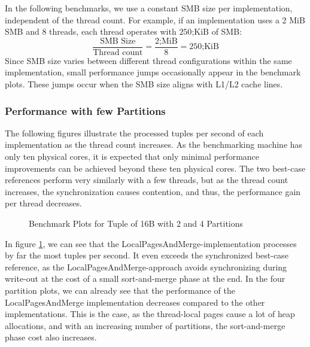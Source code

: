 In the following benchmarks, we use a constant \ac{SMB} size per implementation, independent of the thread count.
For example, if an implementation uses a 2 MiB \ac{SMB} and 8 threads, each thread operates with $250 \textrm{;KiB}$ of \ac{SMB}:
\begin{equation}
  \frac{\textrm{SMB Size}} {\textrm{Thread count}} = \frac{2 \textrm{;MiB}}{8} = 250 \textrm{;KiB}
\end{equation}
Since \ac{SMB} size varies between different thread configurations within the same implementation, small performance jumps occasionally appear in the benchmark plots.
These jumps occur when the \ac{SMB} size aligns with L1/L2 cache lines.

\subsubsection{Performance with few Partitions}
The following figures illustrate the processed tuples per second of each implementation as the thread count increases.
As the benchmarking machine has only ten physical cores, it is expected that only minimal performance improvements can be achieved beyond these ten physical cores.
The two best-case references perform very similarly with a few threads, but as the thread count increases, the synchronization causes contention, and thus, the performance gain per thread decreases.

\begin{figure}[h]
  \centering
  \begin{subfigure}{.49\textwidth}
    \centering
    \resizebox{\linewidth}{!}{}
  \end{subfigure}
  \begin{subfigure}{.49\textwidth}
    \centering
    \resizebox{\linewidth}{!}{}
  \end{subfigure}
  \begin{subfigure}{\textwidth}
    \centering
    \resizebox{\linewidth}{!}{}
  \end{subfigure}
  \caption[Shuffle Benchmark Plots for Tuple of 16B with 2 and 4 Partitions]{Benchmark Plots for Tuple of 16B with 2 and 4 Partitions}
  \label{plot-shuffle-16B-2-4}
\end{figure}
In figure \ref{plot-shuffle-16B-2-4}, we can see that the Local\-Pages\-And\-Merge-implementation processes by far the most tuples per second.
It even exceeds the synchronized best-case reference, as the Local\-Pages\-And\-Merge-approach avoids synchronizing during write-out at the cost of a small sort-and-merge phase at the end.
In the four partition plots, we can already see that the performance of the Local\-Pages\-And\-Merge implementation decreases compared to the other implementations.
This is the case, as the thread-local pages cause a lot of heap allocations, and with an increasing number of partitions, the sort-and-merge phase cost also increases.

